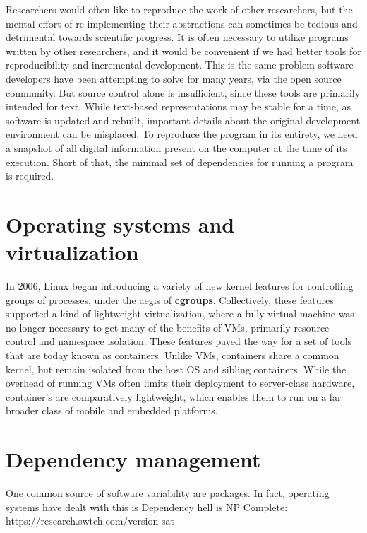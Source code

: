 \documentclass[12pt,initial,twoside,maitrise]{dms}
\numberwithin{equation}{section}
\numberwithin{table}{chapter}
\numberwithin{figure}{chapter}
\begin{document}
Researchers would often like to reproduce the work of other researchers, but the mental effort of re-implementing their abstractions can sometimes be tedious and detrimental towards scientific progress. It is often necessary to utilize programs written by other researchers, and it would be convenient if we had better tools for reproducibility and incremental development. This is the same problem software developers have been attempting to solve for many years, via the open source community. But source control alone is insufficient, since these tools are primarily intended for text. While text-based representations may be stable for a time, as software is updated and rebuilt, important details about the original development environment can be misplaced. To reproduce the program in its entirety, we need a snapshot of all digital information present on the computer at the time of its execution. Short of that, the minimal set of dependencies for running a program is required.

\section{Operating systems and virtualization}\label{sec:os-and-virtualization}

In 2006, Linux began introducing a variety of new kernel features for controlling groups of processes, under the aegis of \textbf{cgroups}\cite{menage2007adding}. Collectively, these features supported a kind of lightweight virtualization, where a fully virtual machine was no longer necessary to get many of the benefits of VMs, primarily resource control and namespace isolation. These features paved the way for a set of tools that are today known as containers. Unlike VMs, containers share a common kernel, but remain isolated from the host OS and sibling containers. While the overhead of running VMs often limits their deployment to server-class hardware, container's are comparatively lightweight, which enables them to run on a far broader class of mobile and embedded platforms.

\section{Dependency management}\label{sec:dependency-management}

One common source of software variability are packages. In fact, operating systems have dealt with this is Dependency hell is NP Complete: https://research.swtch.com/version-sat
\end{document}
